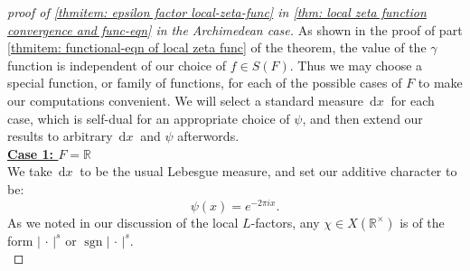\documentclass[11pt, x11names]{book}
\newcommand{\rr}{\mathbb{R}}
\newcommand{\abs}[1]{\left| \, #1  \,\right|}
\DeclareMathOperator{\sgn}{sgn}
\newcommand{\dx}{\, \mathrm{d}x \ }
\begin{document}
\begin{proof}[proof of \ref{thmitem: epsilon factor local-zeta-func} in \ref{thm: local zeta function convergence and func-eqn} in the Archimedean case]
As shown in the proof of part \ref{thmitem: functional-eqn of local zeta func} of the theorem, the value of the $\gamma$ function is independent of our choice of $f \in S(F)$. Thus we may choose a special function, or family of functions, for each of the possible cases of $F$ to make our computations convenient. We will select a standard measure $\dx$ for each case, which is self-dual for an appropriate choice of $\psi$, and then extend our results to arbitrary $\dx$ and $\psi$ afterwords.\\

\textbf{\underline{Case 1: $F = \rr$}}\\
We take $\dx$ to be the usual Lebesgue measure, and set our additive character to be:
\begin{equation*}
    \psi(x) = e^{- 2 \pi i x}.
\end{equation*}
As we noted in our discussion of the local $L$-factors, any $\chi \in X(\rr^\times)$ is of the form $\abs{\cdot}^s$ or $\sgn \abs{\cdot}^s$.\\


\end{proof}
\end{document}
